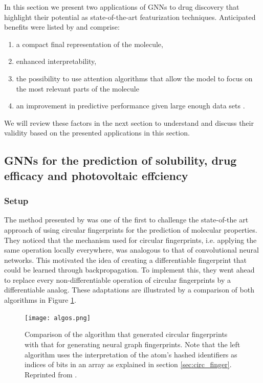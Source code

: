 In this section we present two applications of GNNs to drug discovery that highlight their potential as state-of-the-art featurization techniques. Anticipated benefits were listed by \citep{SHEN201929} and comprise:
\begin{enumerate}
	\item a compact final representation of the molecule, 
	\item enhanced interpretability, 
	\item the possibility to use attention algorithms that allow the model to focus on the most relevant parts of the molecule \citep{deepchemstable, graphattentionmpp}
	\item an improvement in predictive performance given large enough data sets \citep{yangMPP}.
\end{enumerate}
We will review these factors in the next section to understand and discuss their validity based on the presented applications in this section.

\subsection{GNNs for the prediction of solubility, drug efficacy and photovoltaic effciency}
\subsubsection*{Setup}
The method presented by \cite{duvenaud2015convolutional} was one of the first to challenge the state-of-the art approach of using circular fingerprints for the prediction of molecular properties. They noticed that the mechanism used for circular fingerprints, i.e. applying the same operation locally everywhere, was analogous to that of convolutional neural networks. This motivated the idea of creating a differentiable fingerprint that could be learned through backpropagation. To implement this, they went ahead to replace every non-differentiable operation of circular fingerprints by a differentiable analog. These adaptations are illustrated by a comparison of both algorithms in Figure \ref{fig:algos}.

\begin{figure}[h]
	\centering 
	\texttt{[image: algos.png]}
	\caption{Comparison of the algorithm that generated circular fingerprints  with that for generating neural graph fingerprints. Note that the left algorithm uses the interpretation of the atom's hashed identifiers as indices of bits in an array as explained in section \ref{sec:circ_finger}. Reprinted from \cite{duvenaud2015convolutional}. }
	\label{fig:algos}
\end{figure}

